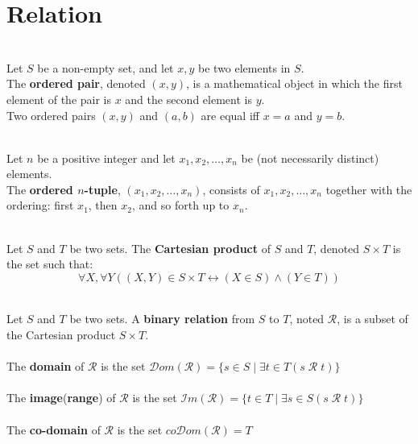 \documentclass[12pt]{article}
\begin{document}
\section{Relation}
\begin{definition}
\hfill\\
\normalfont Let $S$ be a non-empty set, and let $x, y$ be two elements in $S$. \\
The \textbf{ordered pair}, denoted $(x, y)$, is a mathematical object in which the first element of the pair is $x$ and the second element is $y$.\\
Two ordered pairs $(x,y)$ and $(a,b)$ are equal iff $x=a$ and $y=b$.
\end{definition}
\begin{definition}
\hfill\\
\normalfont Let $n$ be a positive integer and let $x_1, x_2,\ldots,x_n$ be (not necessarily distinct) elements.\\
The \textbf{ordered $n$-tuple}, $(x_1,x_2,\ldots,x_n)$, consists of $x_1, x_2,\ldots, x_n$ together with the ordering: first $x_1$, then $x_2$, and so forth up to $x_n$. 
\end{definition}
\begin{definition}
\hfill\\
\normalfont Let $S$ and $T$ be two sets. The \textbf{Cartesian product} of $S$ and $T$, denoted $S\times T$ is the set such that:
\[
\forall X,\forall Y ((X,Y)\in S\times T\leftrightarrow (X\in S)\land (Y\in T))
\]
\end{definition}
\begin{definition}
\hfill\\
\normalfont Let $S$ and $T$ be two sets. A \textbf{binary relation} from $S$ to $T$, noted $\mathcal{R}$, is a subset of the Cartesian product $S\times T$.\\\\
The \textbf{domain} of $\mathcal{R}$ is the set $\mathcal{D}om(\mathcal{R})=\{s\in S\mid \exists t\in T (s\;\mathcal{R} \;t)\}$\\\\
The \textbf{image}(\textbf{range}) of $\mathcal{R}$ is the set $\mathcal{I}m(\mathcal{R})=\{t\in T\mid\exists s\in S(s\;\mathcal{R}\;t)\}$\\\\
The \textbf{co-domain} of $\mathcal{R}$ is the set $co\mathcal{D}om(\mathcal{R})=T$
\end{definition}
\end{document}
